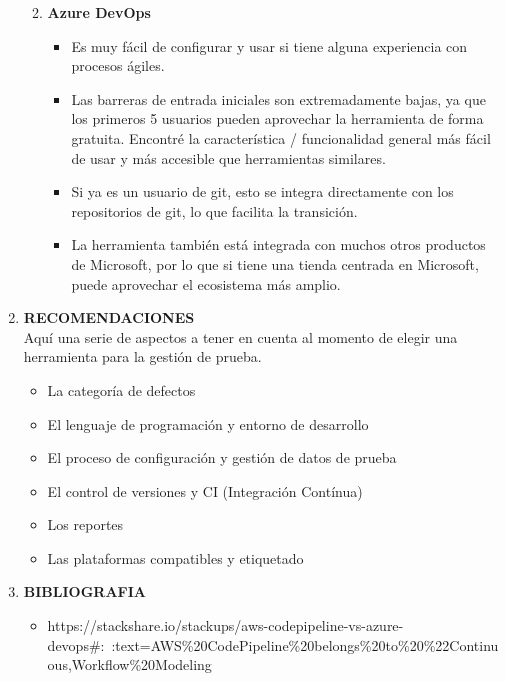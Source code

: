 \documentclass[12pt,a4paper,oneside]{book}
\begin{document}
\begin{enumerate}
\begin{enumerate}
\begin{itemize}
						\end{itemize}
					\item \textbf{Azure DevOps}
						\begin{itemize}
							\item Es muy fácil de configurar y usar si tiene alguna experiencia con procesos ágiles. 
							\item Las barreras de entrada iniciales son extremadamente bajas, ya que los primeros 5 usuarios pueden aprovechar la herramienta de forma gratuita. Encontré la característica / funcionalidad general más fácil de usar y más accesible que herramientas similares. 
							\item Si ya es un usuario de git, esto se integra directamente con los repositorios de git, lo que facilita la transición. 
							\item La herramienta también está integrada con muchos otros productos de Microsoft, por lo que si tiene una tienda centrada en Microsoft, puede aprovechar el ecosistema más amplio.
							
							
						\end{itemize}
				\end{enumerate}
				
		
		\item \textbf{RECOMENDACIONES}\\
			Aquí una serie de aspectos a tener en cuenta al momento de elegir una herramienta para la gestión de prueba.
			
			\begin{itemize}
				\item La categoría de defectos
				\item El lenguaje de programación y entorno de desarrollo
				\item El proceso de configuración y gestión de datos de prueba
				\item El control de versiones y CI (Integración Contínua)
				\item Los reportes
				\item Las plataformas compatibles y etiquetado
				
			\end{itemize}
			
		\item \textbf{BIBLIOGRAFIA}
			\begin{itemize}
				
			\item https://stackshare.io/stackups/aws-codepipeline-vs-azure-devops\#:~:text=AWS\%20CodePipeline\%20belongs\%20to\%20\%22Continuous,Workflow\%20Modeling
			

\end{itemize}
\end{enumerate}
\end{document}
